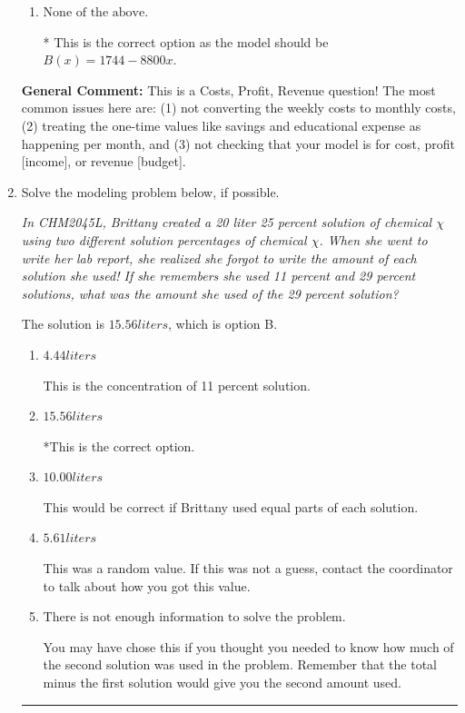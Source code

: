 \documentclass{extbook}[14pt]
\newcommand{\litem}[1]{\item #1

\rule{\textwidth}{0.4pt}}
\begin{document}
\begin{enumerate}
{\begin{enumerate}[label=\Alph*.]
This treats the savings as something you get every month rather than a 1-time payment and is modeling Income, not Budget.
\item \( \text{None of the above.} \)

* This is the correct option as the model should be $B(x) = 1744 - 8800 x$.
\end{enumerate}

\textbf{General Comment:} This is a Costs, Profit, Revenue question! The most common issues here are: (1) not converting the weekly costs to monthly costs, (2) treating the one-time values like savings and educational expense as happening per month, and (3) not checking that your model is for cost, profit [income], or revenue [budget].
}
\litem{
Solve the modeling problem below, if possible.

\begin{center}
    \textit{ In CHM2045L, Brittany created a 20 liter 25 percent solution of chemical $\chi$ using two different solution percentages of chemical $\chi$. When she went to write her lab report, she realized she forgot to write the amount of each solution she used! If she remembers she used 11 percent and 29 percent solutions, what was the amount she used of the 29 percent solution? }
\end{center}
The solution is \( 15.56 liters \), which is option B.\begin{enumerate}[label=\Alph*.]
\item \( 4.44 liters \)

This is the concentration of 11 percent solution.
\item \( 15.56 liters \)

*This is the correct option.
\item \( 10.00 liters \)

This would be correct if Brittany used equal parts of each solution.
\item \( 5.61 liters \)

This was a random value. If this was not a guess, contact the coordinator to talk about how you got this value.
\item \( \text{There is not enough information to solve the problem.} \)

You may have chose this if you thought you needed to know how much of the second solution was used in the problem. Remember that the total minus the first solution would give you the second amount used.
\end{enumerate}

}
\end{enumerate}
\end{document}
